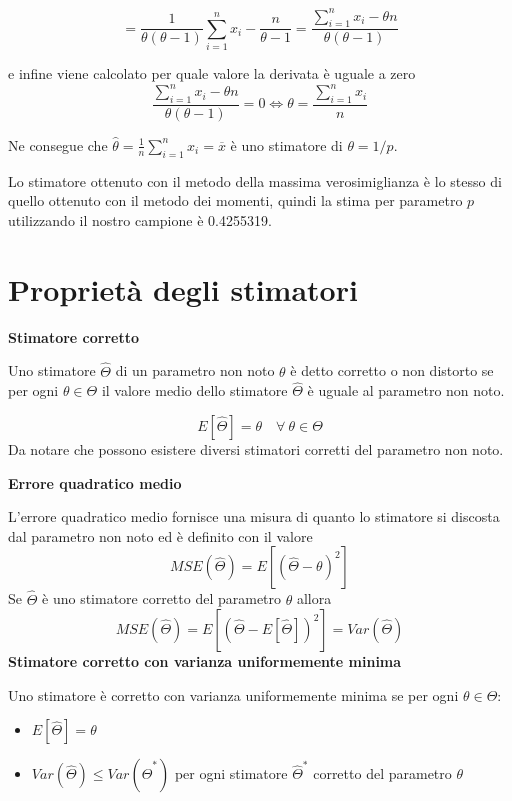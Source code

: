 \documentclass[]{book}
\begin{document}
\[= \frac{1}{\theta (\theta - 1)} \sum_{i=1}^nx_i - \frac{n}{\theta - 1} = \frac{\sum_{i=1}^nx_i - \theta n}{\theta (\theta - 1)} \]

e infine viene calcolato per quale valore la derivata è uguale a zero
\[\frac{\sum_{i=1}^nx_i - \theta n}{\theta (\theta - 1)} = 0 \Leftrightarrow \theta = \frac{\sum_{i=1}^nx_i}{n}\]

Ne consegue che
\(\hat\theta = \frac{1}{n} \sum_{i=1}^nx_i = \overline{x}\) è uno
stimatore di \(\theta = 1 /p\).

Lo stimatore ottenuto con il metodo della massima verosimiglianza è lo
stesso di quello ottenuto con il metodo dei momenti, quindi la stima per
parametro \(p\) utilizzando il nostro campione è 0.4255319.

\section{Proprietà degli stimatori}\label{proprieta-degli-stimatori}

\textbf{Stimatore corretto}

Uno stimatore \(\hat \Theta\) di un parametro non noto \(\theta\) è
detto corretto o non distorto se per ogni \(\theta \in \Theta\) il
valore medio dello stimatore \(\hat \Theta\) è uguale al parametro non
noto.

\[ E[\hat \Theta] = \theta \quad \forall \ \theta \in \Theta\] Da notare
che possono esistere diversi stimatori corretti del parametro non noto.

\textbf{Errore quadratico medio}

L'errore quadratico medio fornisce una misura di quanto lo stimatore si
discosta dal parametro non noto ed è definito con il valore
\[MSE(\hat \Theta) = E[(\hat \Theta - \theta)^2]\] Se \(\hat \Theta\) è
uno stimatore corretto del parametro \(\theta\) allora
\[MSE(\hat \Theta) = E[(\hat \Theta - E[\hat \Theta])^2] = Var(\hat \Theta)\]
\textbf{Stimatore corretto con varianza uniformemente minima}

Uno stimatore è corretto con varianza uniformemente minima se per ogni
\(\theta \in \Theta\):

\begin{itemize}
\item
  \(E[\hat \Theta] = \theta\)
\item
  \(Var(\hat \Theta) \le Var(\hat \Theta^*)\) per ogni stimatore
  \(\hat \Theta^*\) corretto del parametro \(\theta\)
\end{itemize}
\end{document}
